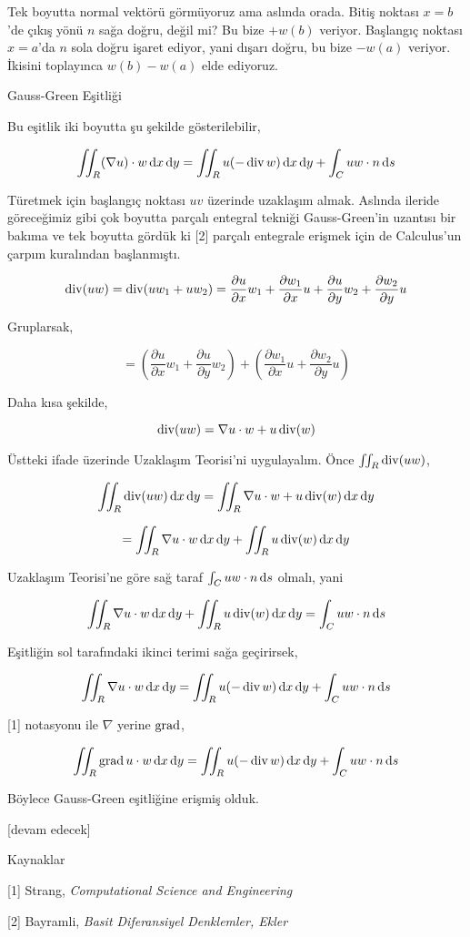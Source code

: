 \documentclass[12pt,fleqn]{article}\usepackage{../../common}
\begin{document}
Tek boyutta normal vektörü görmüyoruz ama aslında orada. Bitiş noktası
$x=b$'de çıkış yönü $n$ sağa doğru, değil mi? Bu bize $+w(b)$ veriyor.
Başlangıç noktası $x=a$'da $n$ sola doğru işaret ediyor, yani dışarı doğru,
bu bize $-w(a)$ veriyor. İkisini toplayınca $w(b) - w(a)$ elde ediyoruz.

Gauss-Green Eşitliği

Bu eşitlik iki boyutta şu şekilde gösterilebilir,

$$
\iint_R (\nabla u ) \cdot w \,\mathrm{d} x \,\mathrm{d} y =
\iint_R u (- \operatorname{div} w) \,\mathrm{d} x \,\mathrm{d} y + \int_C u w \cdot n \,\mathrm{d} s
$$

Türetmek için başlangıç noktası $uv$ üzerinde uzaklaşım almak. Aslında
ileride göreceğimiz gibi çok boyutta parçalı entegral tekniği Gauss-Green'in
uzantısı bir bakıma ve tek boyutta gördük ki [2] parçalı entegrale erişmek
için de Calculus'un çarpım kuralından başlanmıştı.

$$
\operatorname{div} (uw) = \operatorname{div} (u w_1 + u w_2) =
\frac{\partial u}{\partial x} w_1 +
\frac{\partial w_1}{\partial x} u +
\frac{\partial u}{\partial y} w_2 +
\frac{\partial w_2}{\partial y} u 
$$

Gruplarsak,

$$
= \left( 
\frac{\partial u}{\partial x} w_1 +
\frac{\partial u}{\partial y} w_2 \right) +
\left( 
\frac{\partial w_1}{\partial x} u +
\frac{\partial w_2}{\partial y} u \right)
$$

Daha kısa şekilde,

$$
\operatorname{div} (uw) = \nabla u \cdot w + u \operatorname{div}(w)
$$

Üstteki ifade üzerinde Uzaklaşım Teorisi'ni uygulayalım. Önce
$\iint_R \operatorname{div} (uw)$,

$$
\iint_R \operatorname{div} (uw) \,\mathrm{d} x \,\mathrm{d} y= \iint_R \nabla u \cdot w + u \operatorname{div}(w) \,\mathrm{d} x \,\mathrm{d} y
$$

$$
= \iint_R \nabla u \cdot w  \,\mathrm{d} x \,\mathrm{d} y + \iint_R u \operatorname{div}(w) \,\mathrm{d} x \,\mathrm{d} y
$$

Uzaklaşım Teorisi'ne göre sağ taraf $\int_C uw \cdot n \,\mathrm{d} s$ olmalı, yani

$$
\iint_R \nabla u \cdot w  \,\mathrm{d} x \,\mathrm{d} y + \iint_R u \operatorname{div}(w) \,\mathrm{d} x \,\mathrm{d} y = \int_C uw \cdot n \,\mathrm{d} s
$$

Eşitliğin sol tarafındaki ikinci terimi sağa geçirirsek,

$$
\iint_R \nabla u \cdot w  \,\mathrm{d} x \,\mathrm{d} y =
\iint_R u (-\operatorname{div} w) \,\mathrm{d} x \,\mathrm{d} y + \int_C uw \cdot n \,\mathrm{d} s
$$

[1] notasyonu ile $\nabla$ yerine $\operatorname{grad}$,

$$
\iint_R \operatorname{grad} u \cdot w  \,\mathrm{d} x \,\mathrm{d} y =
\iint_R u (-\operatorname{div} w) \,\mathrm{d} x \,\mathrm{d} y + \int_C uw \cdot n \,\mathrm{d} s
$$

Böylece Gauss-Green eşitliğine erişmiş olduk.

[devam edecek]

Kaynaklar

[1] Strang, {\em Computational Science and Engineering}

[2] Bayramli, {\em Basit Diferansiyel Denklemler, Ekler}
\end{document}

